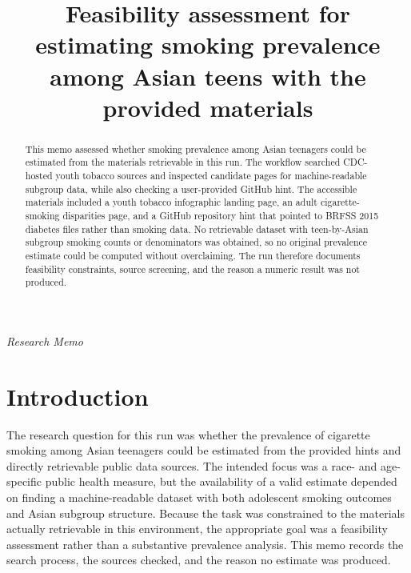 \documentclass[11pt]{article}
\title{Feasibility assessment for estimating smoking prevalence among Asian teens with the provided materials}
\author{}
\date{}
\begin{document}
\maketitle

\begin{center}\small\textit{Research Memo}\end{center}

\begin{abstract}

This memo assessed whether smoking prevalence among Asian teenagers could be estimated from the materials retrievable in this run. The workflow searched CDC-hosted youth tobacco sources and inspected candidate pages for machine-readable subgroup data, while also checking a user-provided GitHub hint. The accessible materials included a youth tobacco infographic landing page, an adult cigarette-smoking disparities page, and a GitHub repository hint that pointed to BRFSS 2015 diabetes files rather than smoking data. No retrievable dataset with teen-by-Asian subgroup smoking counts or denominators was obtained, so no original prevalence estimate could be computed without overclaiming. The run therefore documents feasibility constraints, source screening, and the reason a numeric result was not produced.

\end{abstract}

\section{Introduction}
The research question for this run was whether the prevalence of cigarette smoking among Asian teenagers could be estimated from the provided hints and directly retrievable public data sources. The intended focus was a race- and age-specific public health measure, but the availability of a valid estimate depended on finding a machine-readable dataset with both adolescent smoking outcomes and Asian subgroup structure. Because the task was constrained to the materials actually retrievable in this environment, the appropriate goal was a feasibility assessment rather than a substantive prevalence analysis. This memo records the search process, the sources checked, and the reason no estimate was produced.
\end{document}
